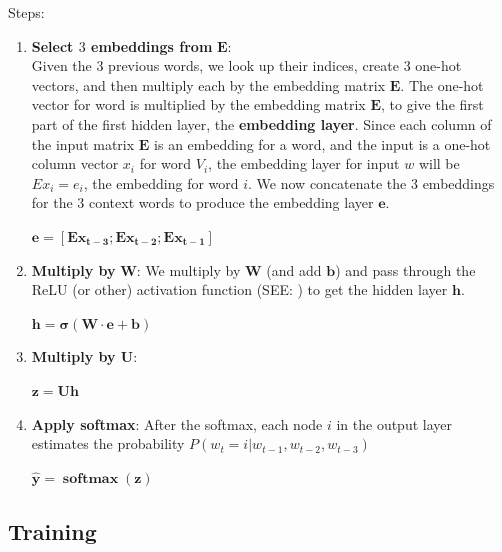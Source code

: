 \vspace{0.2cm}
Steps:
\begin{enumerate}
    \item \textbf{Select $3$ embeddings from} $\mathbf{E}$:\\
    Given the $3$ previous words, we look up their indices, create $3$ one-hot vectors, and then multiply each by the embedding matrix $\mathbf{E}$. The one-hot vector for word is multiplied by the embedding matrix $\mathbf{E}$, to give the first part of the first hidden layer, the \textbf{embedding layer}. Since each column of the input matrix $\mathbf{E}$ is an embedding for a word, and the input is a one-hot column vector $x_i$ for word $V_i$, the embedding layer for input $w$ will be $Ex_i = e_i$, the embedding for word $i$. We now concatenate the 3 embeddings for the 3 context words to produce the embedding layer $\mathbf{e}$.
    \begin{center}
        \( \mathbf{e = [Ex_{t-3};Ex_{t-2};Ex_{t-1}]} \)
    \end{center}

    \item \textbf{Multiply by} $\mathbf{W}$: We multiply by $\mathbf{W}$ (and add $\mathbf{b}$) and pass through the ReLU (or other) activation function (SEE: ) to get the hidden layer $\mathbf{h}$.
    \begin{center}
        \(\mathbf{h = \sigma(W\cdot e+b)}\)
    \end{center}

    \item \textbf{Multiply by U}:
    \begin{center}
        \(\mathbf{z = Uh}\)
    \end{center}

    \item \textbf{Apply softmax}: After the softmax, each node $i$ in the output layer estimates the probability $P(w_t=i|w_{t-1},w_{t-2},w_{t-3})$
    \begin{center}
        \(\mathbf{\hat{y} = \operatorname{softmax}(z)}\)
    \end{center}
    
\end{enumerate}

\subsection{Training}


